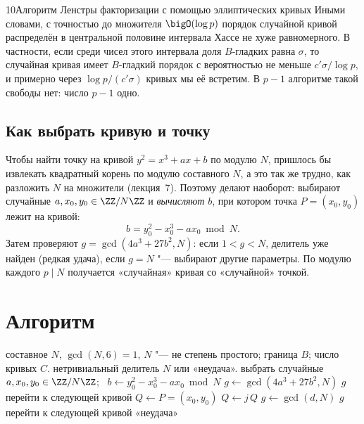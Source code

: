 \begin{lecture}{10}{Алгоритм Ленстры факторизации с помощью эллиптических кривых}
Иными словами, с точностью до множителя $\bigO(\log p)$ порядок случайной кривой распределён в
центральной половине интервала Хассе не хуже равномерного. В частности, если среди чисел этого
интервала доля $B$-гладких равна $\sigma$, то случайная кривая имеет $B$-гладкий порядок с
вероятностью не меньше $c'\sigma/\log p$, и примерно через $\log p/(c'\sigma)$ кривых мы её
встретим. В $p - 1$ алгоритме такой свободы нет: число $p - 1$ одно.

\subsection{Как выбрать кривую и точку}

Чтобы найти точку на кривой $y^2 = x^3 + ax + b$ по модулю $N$, пришлось бы извлекать квадратный
корень по модулю составного $N$, а это так же трудно, как разложить $N$ на множители
(лекция~7). Поэтому делают наоборот: выбирают случайные $a, x_0, y_0 \in \ZZ/N\ZZ$ и
\emph{вычисляют} $b$, при котором точка $P = (x_0, y_0)$ лежит на кривой:
\[
  b = y_0^2 - x_0^3 - a x_0 \bmod N.
\]
Затем проверяют $g = \gcd(4a^3 + 27b^2, N)$: если $1 < g < N$, делитель уже найден (редкая
удача), если $g = N$ "--- выбирают другие параметры. По модулю каждого $p \mid N$ получается
«случайная» кривая со «случайной» точкой.


\section{Алгоритм}

\begin{algorithm}\label{l10:alg}
\begin{algorithmic}[1]
\Require составное $N$, $\gcd(N, 6) = 1$, $N$ "--- не степень простого; граница $B$;
  число кривых $C$.
\Ensure нетривиальный делитель $N$ или «неудача».
  \State выбрать случайные $a, x_0, y_0 \in \ZZ/N\ZZ$; \ $b \gets y_0^2 - x_0^3 - a x_0 \bmod N$
  \State $g \gets \gcd(4a^3 + 27b^2, N)$
   \Return $g$ \EndIf
   перейти к следующей кривой \EndIf
  \State $Q \gets P = (x_0, y_0)$
    \State $Q \gets j\,Q$ 
      \State $g \gets \gcd(d, N)$
       \Return $g$ \EndIf
      \State перейти к следующей кривой 
    \EndIf
  \EndFor
\EndFor
\State \Return «неудача» 
\end{algorithmic}
\end{algorithm}


\end{lecture}
